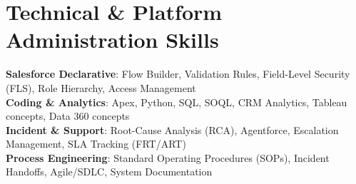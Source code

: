\documentclass[letterpaper,9pt]{article}
\begin{document}
\vspace{-6pt}

\section{Technical \& Platform Administration Skills}
 \begin{itemize}[leftmargin=0.15in, label={}, itemsep=-1pt]
    \small{\item{
     \textbf{Salesforce Declarative}{: Flow Builder, Validation Rules, Field-Level Security (FLS), Role Hierarchy, Access Management} \\
     \textbf{Coding \& Analytics}{: Apex, Python, SQL, SOQL, CRM Analytics, Tableau concepts, Data 360 concepts} \\
     \textbf{Incident \& Support}{: Root-Cause Analysis (RCA), Agentforce, Escalation Management, SLA Tracking (FRT/ART)} \\
     \textbf{Process Engineering}{: Standard Operating Procedures (SOPs), Incident Handoffs, Agile/SDLC, System Documentation}
    }}
 \end{itemize}

\vspace{-6pt}

\end{document}
